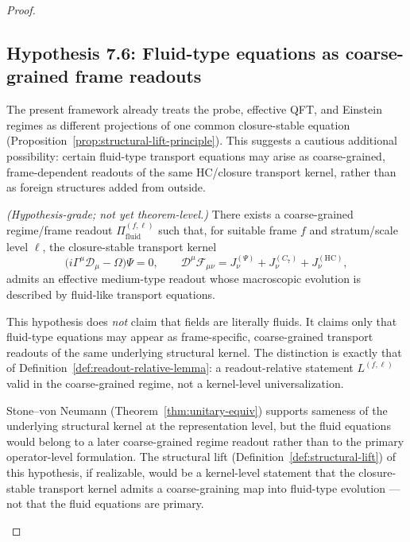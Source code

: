 \begin{proof}
\subsection{Hypothesis 7.6: Fluid-type equations as coarse-grained frame readouts}
\label{subsec:fluid-readout-hypothesis}

The present framework already treats the probe, effective QFT, and
Einstein regimes as different projections of one common closure-stable
equation (Proposition~\ref{prop:structural-lift-principle}). This
suggests a cautious additional possibility: certain fluid-type transport
equations may arise as coarse-grained, frame-dependent readouts of the
same HC/closure transport kernel, rather than as foreign structures added
from outside.

\begin{proposition}
\label{hyp:fluid-readout}
\emph{(Hypothesis-grade; not yet theorem-level.)}
There exists a coarse-grained regime/frame readout
$\Pi_{\mathrm{fluid}}^{(f,\ell)}$
such that, for suitable frame $f$ and stratum/scale level $\ell$, the
closure-stable transport kernel
\[
  \bigl(i\Gamma^\mu\mathcal{D}_\mu - \Omega\bigr)\Psi = 0,
  \qquad
  \mathcal{D}^\mu\mathcal{F}_{\mu\nu}
  = J^{(\Psi)}_\nu + J^{(C_7)}_\nu + J^{(\mathrm{HC})}_\nu,
\]
admits an effective medium-type readout whose macroscopic evolution is
described by fluid-like transport equations.
\end{proposition}

\begin{remark}
This hypothesis does \emph{not} claim that fields are literally fluids.
It claims only that fluid-type equations may appear as frame-specific,
coarse-grained transport readouts of the same underlying structural
kernel. The distinction is exactly that of
Definition~\ref{def:readout-relative-lemma}: a readout-relative statement
$L^{(f,\ell)}$ valid in the coarse-grained regime, not a kernel-level
universalization.
\end{remark}

\begin{remark}
Stone--von Neumann (Theorem~\ref{thm:unitary-equiv}) supports sameness
of the underlying structural kernel at the representation level, but the
fluid equations would belong to a later coarse-grained regime readout
rather than to the primary operator-level formulation. The structural
lift (Definition~\ref{def:structural-lift}) of this hypothesis, if
realizable, would be a kernel-level statement that the closure-stable
transport kernel admits a coarse-graining map into fluid-type evolution
--- not that the fluid equations are primary.
\end{remark}


\end{proof}
